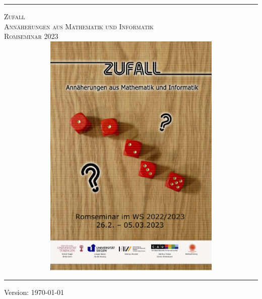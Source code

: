 \begin{titlepage}
	\newcommand{\HRule}{\rule{\linewidth}{.25mm}}
	\HRule
	\vspace*{10pt}
	\begin{center}
	  {\scshape {\Huge Zufall} \\
	  {\Large Annäherungen aus Mathematik und Informatik} \\[5mm]
				{\large Romseminar 2023} \\ }
	\vspace*{15pt}
	\includegraphics[width=14cm, height=12cm, keepaspectratio=true]{./content/Poster_Zufall}
	\vspace*{10pt}	  
	\end{center}
	\HRule
	\begin{center}
	  {Version: \today }
	\end{center}
\end{titlepage}
